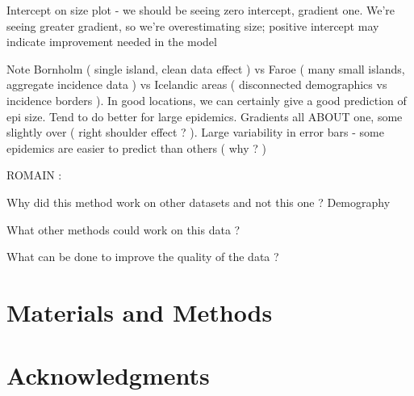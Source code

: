 \documentclass[10pt]{article}
\begin{document}
Intercept on size plot - we should be seeing zero intercept, gradient one. We're seeing greater gradient, so we're overestimating size; positive intercept may indicate improvement needed in the model





Note Bornholm ( single island, clean data effect ) vs Faroe ( many small islands, aggregate incidence data ) vs Icelandic areas ( disconnected demographics vs incidence borders ). In good locations, we can certainly give a good prediction of epi size. Tend to do better for large epidemics. Gradients all ABOUT one, some slightly over ( right shoulder effect ? ). Large variability in error bars - some epidemics are easier to predict than others ( why ? )




ROMAIN :

Why did this method work on other datasets and not this one ? Demography

What other methods could work on this data ?

What can be done to improve the quality of the data ?






\section*{Materials and Methods}











\section*{Acknowledgments}










\end{document}

